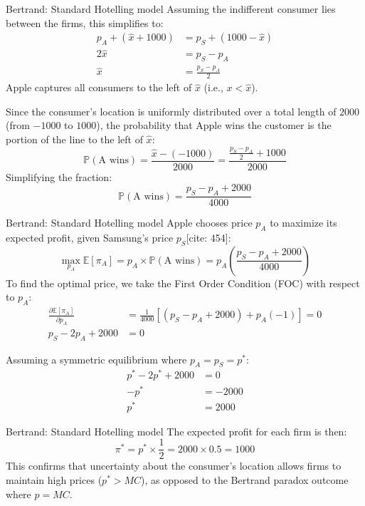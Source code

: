 \documentclass{beamer}
\begin{document}
\begin{frame}{Bertrand: Standard Hotelling model}
Assuming the indifferent consumer lies between the firms, this simplifies to:
\begin{align}
    p_A + (\hat{x} + 1000) &= p_S + (1000 - \hat{x}) \\
    2\hat{x} &= p_S - p_A \\
    \hat{x} &= \frac{p_S - p_A}{2}
\end{align}
Apple captures all consumers to the left of $\hat{x}$ (i.e., $x < \hat{x}$).

Since the consumer's location is uniformly distributed over a total length of $2000$ (from $-1000$ to $1000$), the probability that Apple wins the customer is the portion of the line to the left of $\hat{x}$:
\begin{equation}
    \mathbb{P}(\text{A wins}) = \frac{\hat{x} - (-1000)}{2000} = \frac{\frac{p_S - p_A}{2} + 1000}{2000}
\end{equation}
Simplifying the fraction:
\begin{equation}
    \mathbb{P}(\text{A wins}) = \frac{p_S - p_A + 2000}{4000}
\end{equation}    
\end{frame}

\begin{frame}{Bertrand: Standard Hotelling model}
    Apple chooses price $p_A$ to maximize its expected profit, given Samsung's price $p_S$[cite: 454]:
\begin{equation}
    \max_{p_A} \mathbb{E}[\pi_A] = p_A \times \mathbb{P}(\text{A wins}) = p_A \left( \frac{p_S - p_A + 2000}{4000} \right)
\end{equation}
To find the optimal price, we take the First Order Condition (FOC) with respect to $p_A$:
\begin{align}
    \frac{\partial \mathbb{E}[\pi_A]}{\partial p_A} &= \frac{1}{4000} \left[ (p_S - p_A + 2000) + p_A(-1) \right] = 0 \\
    p_S - 2p_A + 2000 &= 0
\end{align}

Assuming a symmetric equilibrium where $p_A = p_S = p^*$:
\begin{align}
    p^* - 2p^* + 2000 &= 0 \\
    -p^* &= -2000 \\
    p^* &= 2000
\end{align}
\end{frame}

\begin{frame}{Bertrand: Standard Hotelling model}
The expected profit for each firm is then:
\begin{equation}
    \pi^* = p^* \times \frac{1}{2} = 2000 \times 0.5 = 1000
\end{equation}
This confirms that uncertainty about the consumer's location allows firms to maintain high prices ($p^* > MC$), as opposed to the Bertrand paradox outcome where $p=MC$.
\end{frame}
\end{document}
